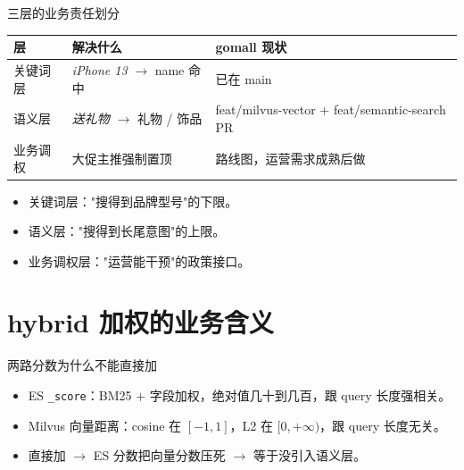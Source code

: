\begin{frame}{三层的业务责任划分}
\begin{tabular}{@{}lp{4.0cm}p{5.0cm}@{}}
\toprule
层 & 解决什么 & gomall 现状 \\
\midrule
关键词层 & \textit{iPhone 13} $\to$ name 命中 & 已在 main \\
语义层   & \textit{送礼物} $\to$ 礼物 / 饰品   & feat/milvus-vector + feat/semantic-search PR \\
业务调权 & 大促主推强制置顶 & 路线图，运营需求成熟后做 \\
\bottomrule
\end{tabular}
\vspace{2mm}
\begin{itemize}
  \item 关键词层："搜得到品牌型号"的下限。
  \item 语义层："搜得到长尾意图"的上限。
  \item 业务调权层："运营能干预"的政策接口。
\end{itemize}
\end{frame}

\section{hybrid 加权的业务含义}

\begin{frame}{两路分数为什么不能直接加}
\begin{itemize}
  \item ES \texttt{\_score}：BM25 + 字段加权，绝对值几十到几百，跟 query 长度强相关。
  \item Milvus 向量距离：cosine 在 $[-1, 1]$，L2 在 $[0, +\infty)$，跟 query 长度无关。
  \item 直接加 $\to$ ES 分数把向量分数压死 $\to$ 等于没引入语义层。
\end{itemize}
\vspace{2mm}
\end{frame}

